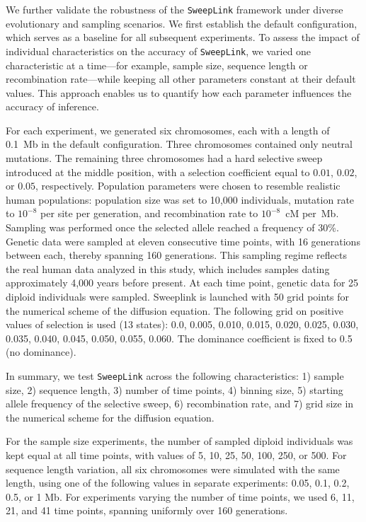 \documentclass{article}
\newcommand{\SweepLink}{\texttt{SweepLink}\xspace}
\begin{document}
We further validate the robustness of the \SweepLink framework under diverse evolutionary and sampling scenarios.
We first establish the default configuration, which serves as a baseline for all subsequent experiments.
To assess the impact of individual characteristics on the accuracy of \texttt{SweepLink}, we varied one characteristic at a time---for example, sample size, sequence length or recombination rate---while keeping all other parameters constant at their default values.
This approach enables us to quantify how each parameter influences the accuracy of inference.

For each experiment, we generated six chromosomes, each with a length of 0.1~Mb in the default configuration.
Three chromosomes contained only neutral mutations.
The remaining three chromosomes had a hard selective sweep introduced at the middle position, with a selection coefficient equal to $0.01$, $0.02$, or $0.05$, respectively.
Population parameters were chosen to resemble realistic human populations: population size was set to 10{,}000 individuals, mutation rate to $10^{-8}$ per site per generation, and recombination rate to $10^{-8}$~cM per~Mb.
Sampling was performed once the selected allele reached a frequency of 30\%.
Genetic data were sampled at eleven consecutive time points, with 16 generations between each, thereby spanning 160 generations.
This sampling regime reflects the real human data analyzed in this study, which includes samples dating approximately 4,000 years before present.
At each time point, genetic data for 25 diploid individuals were sampled.
Sweeplink is launched with 50 grid points for the numerical scheme of the diffusion equation.
The following grid on positive values of selection is used (13 states): 0.0, 0.005, 0.010, 0.015, 0.020, 0.025, 0.030, 0.035, 0.040, 0.045, 0.050, 0.055, 0.060.
The dominance coefficient is fixed to 0.5 (no dominance).

In summary, we test \texttt{SweepLink} across the following characteristics: 1) sample size, 2) sequence length, 3) number of time points, 4) binning size, 5) starting allele frequency of the selective sweep, 6) recombination rate, and 7) grid size in the numerical scheme for the diffusion equation.

For the sample size experiments, the number of sampled diploid individuals was kept equal at all time points, with values of 5, 10, 25, 50, 100, 250, or 500.
For sequence length variation, all six chromosomes were simulated with the same length, using one of the following values in separate experiments: 0.05, 0.1, 0.2, 0.5, or 1 Mb.
For experiments varying the number of time points, we used 6, 11, 21, and 41 time points, spanning uniformly over 160 generations.
\end{document}
